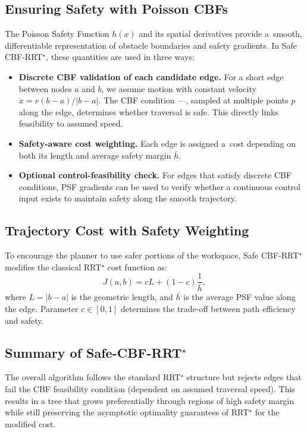 \documentclass[letterpaper, 10 pt, conference]{ieeeconf}
\begin{document}
\subsection{Ensuring Safety with Poisson CBFs}
The Poisson Safety Function $h(x)$ and its spatial derivatives provide
a~smooth, differentiable representation of obstacle boundaries and safety
gradients. In Safe CBF-RRT$^\star$, these quantities are used in three ways:
\begin{itemize}
    \item \textbf{Discrete CBF validation of each candidate edge.}
    For a short edge between nodes $a$ and $b$, we assume motion with constant velocity $\dot{x}=v(b-a)/|b-a|$.
    The CBF condition ---,
    sampled at multiple points $p$ along the edge, determines whether traversal is safe.
    This directly links feasibility to assumed speed.
    \item \textbf{Safety-aware cost weighting.}
    Each edge is assigned a~cost depending on both its length and average safety margin $\bar h$.
    \item \textbf{Optional control-feasibility check.}
    For edges that satisfy discrete CBF conditions, PSF gradients can be used to verify whether a continuous control input exists to maintain safety along the smooth trajectory.
\end{itemize}

\subsection{Trajectory Cost with Safety Weighting}
To encourage the planner to use safer portions of the workspace, Safe
CBF-RRT$^\star$ modifies the classical RRT$^\star$ cost function as:
\begin{equation}
J(a,b)=cL + (1-c)\frac{1}{\bar{h}},
\end{equation}
where $L=|b-a|$ is the geometric length, and $\bar{h}$ is the average PSF value along the edge.
Parameter $c\in[0,1]$ determines the trade-off between path efficiency and safety.

\subsection{Summary of Safe-CBF-RRT$^\star$}
The overall algorithm follows the standard RRT$^\star$ structure
but rejects edges that fail the CBF feasibility condition
(dependent on assumed traversal speed).
This results in a tree that grows preferentially through regions
of high safety margin while still preserving the asymptotic optimality
guarantees of RRT$^\star$ for the modified cost.
\end{document}
